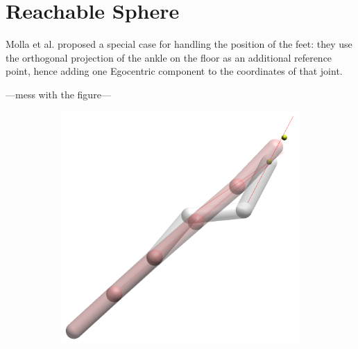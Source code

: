 \section{Reachable Sphere}
\label{sec:reachableSphere}

Molla et al. \cite{molla2017egocentric} proposed a special case for handling the position of the feet: they use the orthogonal projection of the ankle on the floor as an additional reference point, hence adding one Egocentric component to the coordinates of that joint.

---mess with the figure---

\begin{figure}[h]
    \centering
    \begin{subfigure}[b]{.35\textwidth}
        \includegraphics[width=\textwidth]{Figures/arm-full-nosphere.png}
    \end{subfigure}
    ~
    \begin{subfigure}[b]{.35\textwidth}

\end{subfigure}
\end{figure}
